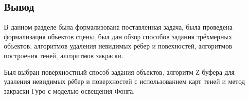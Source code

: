 \subsection*{Вывод}

В данном разделе была формализована поставленная задача, была проведена формализация объектов сцены, был дан обзор способов задания трёхмерных объектов, алгоритмов удаления невидимых рёбер и повехностей, алгоритмов построения теней, алгоритмов закраски. 

Был выбран поверхностный способ задания объектов, алгоритм Z-буфера для удаления невидимых рёбер и поверхностей с использованием карт теней и метод закраски Гуро с моделью освещения Фонга.





	